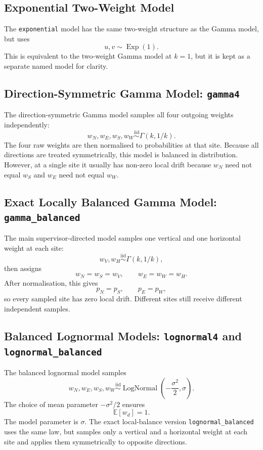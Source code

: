 \documentclass[11pt]{article}
\begin{document}
\subsection{Exponential Two-Weight Model}

The \texttt{exponential} model has the same two-weight structure as the Gamma
model, but uses
\[
  u,v \sim \operatorname{Exp}(1).
\]
This is equivalent to the two-weight Gamma model at $k=1$, but it is kept as a
separate named model for clarity.

\subsection{Direction-Symmetric Gamma Model: \texttt{gamma4}}

The direction-symmetric Gamma model samples all four outgoing weights
independently:
\[
  w_N,w_E,w_S,w_W \stackrel{\text{iid}}{\sim} \Gamma(k,1/k).
\]
The four raw weights are then normalised to probabilities at that site.
Because all directions are treated symmetrically, this model is balanced in
distribution. However, at a single site it usually has non-zero local drift
because $w_N$ need not equal $w_S$ and $w_E$ need not equal $w_W$.

\subsection{Exact Locally Balanced Gamma Model: \texttt{gamma\_balanced}}

The main supervisor-directed model samples one vertical and one horizontal
weight at each site:
\[
  w_V,w_H \stackrel{\text{iid}}{\sim} \Gamma(k,1/k),
\]
then assigns
\[
  w_N=w_S=w_V,\qquad w_E=w_W=w_H.
\]
After normalisation, this gives
\[
  p_N=p_S,\qquad p_E=p_W,
\]
so every sampled site has zero local drift. Different sites still receive
different independent samples.

\subsection{Balanced Lognormal Models: \texttt{lognormal4} and
\texttt{lognormal\_balanced}}

The balanced lognormal model samples
\[
  w_N,w_E,w_S,w_W \stackrel{\text{iid}}{\sim}
  \operatorname{LogNormal}\left(-\frac{\sigma^2}{2},\sigma\right).
\]
The choice of mean parameter $-\sigma^2/2$ ensures
\[
  \mathbb{E}[w_d]=1.
\]
The model parameter is $\sigma$.
The exact local-balance version \texttt{lognormal\_balanced} uses the same law,
but samples only a vertical and a horizontal weight at each site and applies
them symmetrically to opposite directions.
\end{document}

